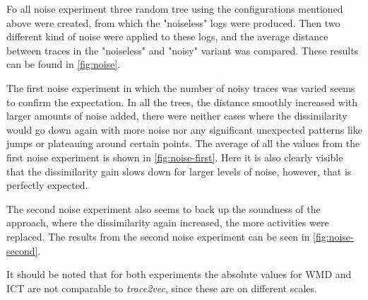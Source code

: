 \documentclass[runningheads]{template/llncs}
\begin{document}
Fo all noise experiment three random tree using the configurations mentioned above were created, from which the "noiseless" logs were produced.
Then two different kind of noise were applied to these logs, and the average distance between traces in the "noiseless" and "noisy" variant was compared.
These results can be found in \cref{fig:noise}.

The first noise experiment in which the number of noisy traces was varied seems to confirm the expectation.
In all the trees, the distance smoothly increased with larger amounts of noise added, there were neither cases where the dissimilarity would go down again with more noise nor any significant unexpected patterns like jumps or plateauing around certain points.
The average of all the values from the first noise experiment is shown in \cref{fig:noise-first}.
Here it is also clearly visible that the dissimilarity gain slows down for larger levels of noise, however, that is perfectly expected. 

The second noise experiment also seems to back up the soundness of the approach, where the dissimilarity again increased, the more activities were replaced.
The results from the second noise experiment can be seen in \cref{fig:noise-second}.

It should be noted that for both experiments the absolute values for WMD and ICT are not comparable to \emph{trace2vec}, since these are on different scales.
\end{document}
